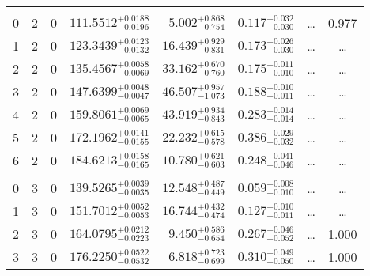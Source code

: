 \begin{table*}[!]
\begin{tabular}{llcrrlrc}
\hline \\[-8pt]
0 & 2 & 0 & $    111.5512_{-      0.0196}^{+      0.0188}$ & $       5.002_{-       0.754}^{+       0.868}$ & $       0.117_{-       0.030}^{+       0.032}$ & \multicolumn{1}{c}{\dots} & 0.977\\[1pt]
1 & 2 & 0 & $    123.3439_{-      0.0132}^{+      0.0123}$ & $      16.439_{-       0.831}^{+       0.929}$ & $       0.173_{-       0.030}^{+       0.026}$ & \multicolumn{1}{c}{\dots} & \dots \\[1pt]
2 & 2 & 0 & $    135.4567_{-      0.0069}^{+      0.0058}$ & $      33.162_{-       0.760}^{+       0.670}$ & $       0.175_{-       0.010}^{+       0.011}$ & \multicolumn{1}{c}{\dots} & \dots \\[1pt]
3 & 2 & 0 & $    147.6399_{-      0.0047}^{+      0.0048}$ & $      46.507_{-       1.073}^{+       0.957}$ & $       0.188_{-       0.011}^{+       0.010}$ & \multicolumn{1}{c}{\dots} & \dots \\[1pt]
4 & 2 & 0 & $    159.8061_{-      0.0065}^{+      0.0069}$ & $      43.919_{-       0.843}^{+       0.934}$ & $       0.283_{-       0.014}^{+       0.014}$ & \multicolumn{1}{c}{\dots} & \dots \\[1pt]
5 & 2 & 0 & $    172.1962_{-      0.0155}^{+      0.0141}$ & $      22.232_{-       0.578}^{+       0.615}$ & $       0.386_{-       0.032}^{+       0.029}$ & \multicolumn{1}{c}{\dots} & \dots \\[1pt]
6 & 2 & 0 & $    184.6213_{-      0.0165}^{+      0.0158}$ & $      10.780_{-       0.603}^{+       0.621}$ & $       0.248_{-       0.046}^{+       0.041}$ & \multicolumn{1}{c}{\dots} & \dots \\[1pt]
\hline \\[-8pt]
0 & 3 & 0 & $    139.5265_{-      0.0035}^{+      0.0039}$ & $      12.548_{-       0.449}^{+       0.487}$ & $       0.059_{-       0.010}^{+       0.008}$ & \multicolumn{1}{c}{\dots} & \dots \\[1pt]
1 & 3 & 0 & $    151.7012_{-      0.0053}^{+      0.0052}$ & $      16.744_{-       0.474}^{+       0.432}$ & $       0.127_{-       0.011}^{+       0.010}$ & \multicolumn{1}{c}{\dots} & \dots \\[1pt]
2 & 3 & 0 & $    164.0795_{-      0.0223}^{+      0.0212}$ & $       9.450_{-       0.654}^{+       0.586}$ & $       0.267_{-       0.052}^{+       0.046}$ & \multicolumn{1}{c}{\dots} & 1.000 \\[1pt]
3 & 3 & 0 & $    176.2250_{-      0.0532}^{+      0.0522}$ & $       6.818_{-       0.699}^{+       0.723}$ & $       0.310_{-       0.050}^{+       0.049}$ & \multicolumn{1}{c}{\dots} & 1.000\\[1pt]
\hline
\end{tabular}
\end{table*}